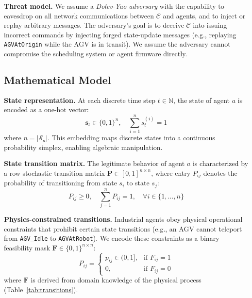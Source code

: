 \documentclass[manuscript,screen,review]{acmart}
\begin{document}
\textbf{Threat model.} We assume a \textit{Dolev-Yao adversary}
with the capability to eavesdrop on all network communications
between $\mathcal{C}$ and agents, and to inject or replay
arbitrary messages. The adversary's goal is to deceive
$\mathcal{C}$ into issuing incorrect commands by injecting
forged state-update messages (e.g., replaying
\texttt{AGVAtOrigin} while the AGV is in transit). We assume
the adversary cannot compromise the scheduling system or
agent firmware directly.

\subsection{Mathematical Model}
\label{subsec:mathmodel}

\textbf{State representation.} At each discrete time step
$t \in \mathbb{N}$, the state of agent $a$ is encoded as a
one-hot vector:
\begin{equation}
  \mathbf{s}_t \in \{0,1\}^{n}, \quad \sum_{i=1}^{n} s_t^{(i)} = 1
  \label{eq:onehot}
\end{equation}
where $n = |\mathcal{S}_a|$. This embedding maps discrete
states into a continuous probability simplex, enabling
algebraic manipulation.

\textbf{State transition matrix.} The legitimate behavior of
agent $a$ is characterized by a row-stochastic transition
matrix $\mathbf{P} \in [0,1]^{n \times n}$, where entry
$P_{ij}$ denotes the probability of transitioning from state
$s_i$ to state $s_j$:
\begin{equation}
  P_{ij} \geq 0, \quad \sum_{j=1}^{n} P_{ij} = 1,
  \quad \forall i \in \{1,\ldots,n\}
  \label{eq:stochastic}
\end{equation}

\textbf{Physics-constrained transitions.} Industrial agents
obey physical operational constraints that prohibit certain
state transitions (e.g., an AGV cannot teleport from
\texttt{AGV\_Idle} to \texttt{AGVAtRobot}). We encode these constraints
as a binary feasibility mask $\mathbf{F} \in \{0,1\}^{n\times n}$:
\begin{equation}
  P_{ij} =
  \begin{cases}
    p_{ij} \in (0,1], & \text{if } F_{ij} = 1 \\
    0, & \text{if } F_{ij} = 0
  \end{cases}
  \label{eq:constrained_P}
\end{equation}
where $\mathbf{F}$ is derived from domain knowledge of the
physical process (Table~\ref{tab:transitions}).
\end{document}
